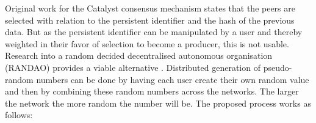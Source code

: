 Original work for the Catalyst consensus mechanism states that the peers are selected with relation to the persistent identifier and the hash of the previous data. But as the persistent identifier can be manipulated by a user and thereby weighted in their favor of selection to become a producer, this is not usable. \\

Research into a random decided decentralised autonomous organisation (RANDAO) provides a viable alternative \cite{skvorc}\cite{randao}. Distributed generation of pseudo-random numbers can be done by having each user create their own random value and then by combining these random numbers across the networks. The larger the network the more random the number will be. The proposed process works as follows: \\

